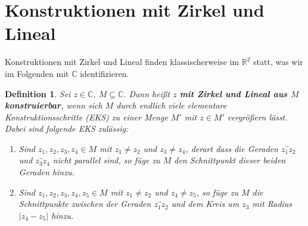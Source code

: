 \documentclass[a4paper, twoside, 11pt, ngerman]{report}
\newcommand{\CC}{\mathds C}
\newcommand{\RR}{\mathds R}
\theoremstyle{definistyle}
\newtheorem{defini}[satz]{Definition}
\theoremstyle{remark}
\newcommand{\defn}[1]{\textit{\bfseries #1}}
\begin{document}
\section{Konstruktionen mit Zirkel und Lineal}
Konstruktionen mit Zirkel und Lineal finden klassischerweise im $\RR^2$ statt, was wir im Folgenden mit $\CC$ identifizieren.
\begin{defini}
Sei $z \in \CC$, $M \subseteq \CC$. Dann heißt $z$ \defn{mit Zirkel und Lineal aus $M$ konstruierbar}, wenn sich $M$ durch endlich viele elementare Konstruktionsschritte (EKS) zu einer Menge $M'$ mit $z \in M'$ vergrößern lässt. Dabei sind folgende EKS zulässig:
\begin{enumerate}
    \item[(I)] Sind $z_1, z_2, z_3, z_4 \in M$ mit $z_1 \neq z_2$ und $z_3 \neq z_4$, derart dass die Geraden $\overleftrightarrow{z_1z_2}$ und $\overleftrightarrow{z_3z_4}$ nicht parallel sind, so füge zu $M$ den Schnittpunkt dieser beiden Geraden hinzu.
\begin{center}
\end{center}
\item[(II)] Sind $z_1, z_2, z_3, z_4, z_5 \in M$ mit $z_1 \neq z_2$ und $z_4 \neq z_5$, 
so füge zu $M$ die Schnittpunkte zwischen der Geraden $\overleftrightarrow{z_1 z_2}$ 
und dem Kreis um $z_3$ mit Radius $\lvert z_4 - z_5 \rvert$ hinzu.
\begin{center}
\begin{tikzpicture}[scale=0.7]


\end{tikzpicture}
\end{center}
\end{enumerate}
\end{defini}
\end{document}
